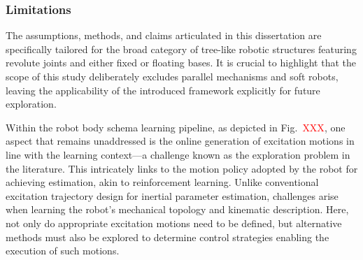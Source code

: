 \documentclass[12pt, a4paper]{article}
\newcommand{\redtext}[1]{\textcolor{red}{#1}}
\begin{document}
%
%





\subsubsection*{Limitations}

The assumptions, methods, and claims articulated in this dissertation are specifically tailored for the broad category of tree-like robotic structures featuring revolute joints and either fixed or floating bases. It is crucial to highlight that the scope of this study deliberately excludes parallel mechanisms and soft robots, leaving the applicability of the introduced framework explicitly for future exploration.

Within the robot body schema learning pipeline, as depicted in Fig.~\redtext{XXX}, one aspect that remains unaddressed is the online generation of excitation motions in line with the learning context—a challenge known as the exploration problem in the literature. This intricately links to the motion policy adopted by the robot for achieving estimation, akin to reinforcement learning. Unlike conventional excitation trajectory design for inertial parameter estimation, challenges arise when learning the robot's mechanical topology and kinematic description. Here, not only do appropriate excitation motions need to be defined, but alternative methods must also be explored to determine control strategies enabling the execution of such motions.
\end{document}
